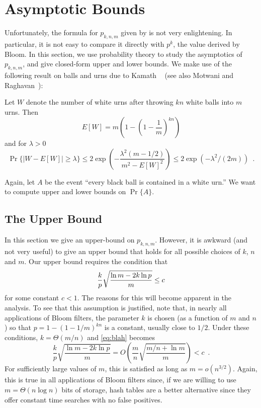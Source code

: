 \documentclass[lotsofwhite]{patmorin}
\newcommand{\blah}{\frac{k}{p}\sqrt{\frac{\ln m-2k\ln p}{m}}}
\begin{document}
\section{Asymptotic Bounds}

Unfortunately, the formula for $p_{k,n,m}$ given by  is
not very enlightening.  In particular, it is not easy to compare it
directly with $p^k$, the value derived by Bloom.  In this section, we
use probability theory to study the asymptotics of $p_{k,n,m}$, and
give closed-form upper and lower bounds.  We make use of the following
result on balls and urns due to Kamath \etal\ \cite{kmps94} (see also
Motwani and Raghavan~\cite[Theorem~4.18]{mr95}):

\begin{thm}
Let $W$ denote the number of white urns after throwing $kn$ white balls into
$m$ urns. Then
\[
    E[W] = m\left(1-\left(1-\frac{1}{m}\right)^{kn}\right)
\]
and for $\lambda > 0$
\[
    \Pr\{|W - E[W]| \ge \lambda\} \le 2\exp\left(
        -\frac{\lambda^2(m-1/2)}{m^2-E[W]^2}\right) \le
2\exp(-\lambda^2/(2m)) \enspace .
\]
\end{thm}

Again, let $A$ be the event ``every black ball is contained in a white
urn.'' We want to compute upper and lower bounds on $\Pr\{A\}$.  

\subsection{The Upper Bound}

In this section we give an upper-bound on $p_{k,n,m}$. However, it is
awkward (and not very useful) to give an upper bound that holds for
all possible choices of $k$, $n$ and $m$.  Our upper bound requires
the condition that
\begin{equation}
	\blah \le c  \eqlabel{blah}
\end{equation}
for some constant $c < 1$.  The reasons for this will become apparent
in the analysis.  To see that this assumption is justified, note that,
in nearly all applications of Bloom filters, the parameter $k$ is
chosen (as a function of $m$ and $n$) so that $p=1-(1-1/m)^{kn}$ is a
constant, usually close to $1/2$. Under these conditions, $k = \Theta(m/n)$
and \eqref{eq:blah} becomes
\[
        \blah = O\left(\frac{m}{n}\sqrt{\frac{m/n+\ln m}{m}}\right) < c
\enspace .
\]
For sufficiently large values of $m$, this is satisfied as long as $m
= o(n^{3/2})$.  Again, this is true in all applications of Bloom
filters since, if we are willing to use $m=\Theta(n\log n)$ bits of
storage, hash tables are a better alternative since they offer
constant time searches with no false positives.
\end{document}
